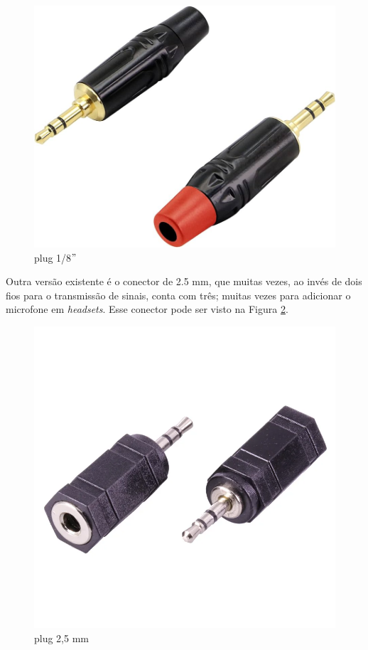 \begin{figure}[h]
	\centering
    \includegraphics[scale=0.2]{figuras/fig20.png}
	\caption{plug 1/8$"$ \cite{mouser}}
	\label{fig20}
\end{figure}

Outra versão existente é o conector de 2.5 mm, que muitas vezes, ao invés de dois fios para o transmissão de sinais, conta com três; muitas vezes para adicionar o microfone em \textit{headsets}. Esse conector pode ser visto na Figura \ref{fig21}.

\begin{figure}[h]
	\centering
    \includegraphics[scale=0.2]{figuras/fig21.png}
	\caption{plug 2,5 mm \cite{mouser}}
	\label{fig21}
\end{figure}

